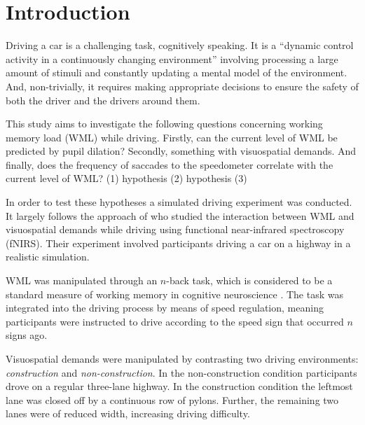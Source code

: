 
\section{Introduction}\label{sec:introduction}
Driving a car is a challenging task, cognitively speaking. 
It is a ``dynamic control activity in a continuously changing environment'' \citep[p.~18]{DeWaard1996} 
involving processing a large amount of stimuli and constantly updating a mental model of the environment.
And, non-trivially, it requires making appropriate decisions to ensure the safety of both the driver and the drivers around them.





This study aims to investigate the following questions concerning working memory load (WML) while driving. 
Firstly, can the current level of WML be predicted by pupil dilation? 
Secondly, something with visuospatial demands. 
And finally, does the frequency of saccades to the speedometer correlate with the current level of WML?\@ 
(1) hypothesis
(2) hypothesis
(3) 

In order to test these hypotheses a simulated driving experiment was conducted.
It largely follows the approach of \citet{Scheunemann2019} who studied the interaction between WML and visuospatial demands while driving using functional near-infrared spectroscopy (fNIRS).
Their experiment involved participants driving a car on a highway in a realistic simulation. 

WML was manipulated through an \(n\)-back task, which is considered to be a standard measure of working memory in cognitive neuroscience \citep{Kane2007}.
The task was integrated into the driving process by means of speed regulation, meaning participants were instructed to drive according to the speed sign that occurred \(n\) signs ago.

Visuospatial demands were manipulated by contrasting two driving environments: \textit{construction} and \textit{non-construction}.
In the non-construction condition participants drove on a regular three-lane highway.
In the construction condition the leftmost lane was closed off by a continuous row of pylons.
Further, the remaining two lanes were of reduced width, increasing driving difficulty.